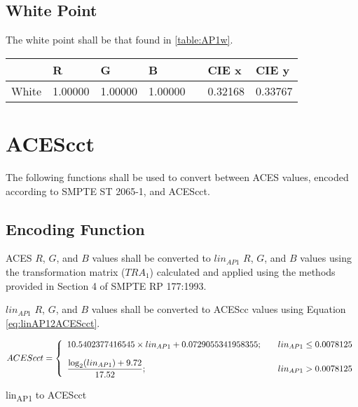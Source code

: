 \subsection{White Point}
The white point shall be that found in \autoref{table:AP1w}.

\begin{center}
\begin{tabularx}{4.5in}{XlllXll}
        & R       & G       & B       & & CIE x & CIE y \\ \hline
White   & 1.00000 & 1.00000 & 1.00000 & & 0.32168 & 0.33767 \\
\end{tabularx}
\label{table:AP1w}
\end{center}

\newpage
\section{ACEScct}
\label{sec:ACEScct}
The following functions shall be used to convert between ACES values, encoded according to SMPTE ST 2065-1, and ACEScct.

\subsection{Encoding Function}
ACES $R$, $G$, and $B$ values shall be converted to $lin_{AP1}$ $R$, $G$, and $B$ values using the transformation matrix ($TRA_{1}$) calculated and applied using the methods provided in Section 4 of SMPTE RP 177:1993.

$lin_{AP1}$ $R$, $G$, and $B$ values shall be converted to ACEScc values using Equation \ref{eq:linAP12ACEScct}.

\begin{floatequ} 
\begin{equation} 
    ACEScct = \left\{ 
    \begin{array}{l l }
        10.5402377416545 \times lin_{AP1} + 0.0729055341958355;    & \quad lin_{AP1} \leq 0.0078125 \\[10pt]
        \dfrac{\log_{2}(lin_{AP1}) + 9.72}{17.52}; & \quad lin_{AP1} > 0.0078125 \\    
    \end{array} \right.
\end{equation}
\caption{lin\textsubscript{AP1} to ACEScct}
\label{eq:linAP12ACEScct}
\end{floatequ}


